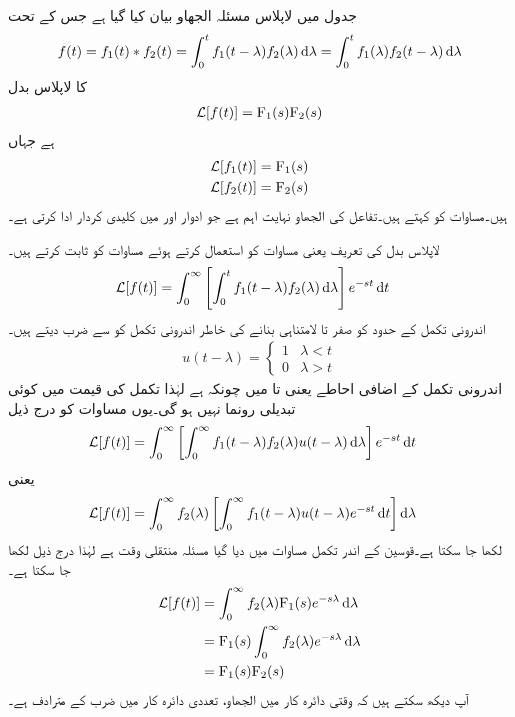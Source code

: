 جدول  میں لاپلاس مسئلہ الجھاو بیان کیا گیا ہے جس کے تحت 
\begin{align}\label{مساوات_لاپلاس_الجھاو_تعریف}
f(t)=f_1(t) \ast f_2(t)=\int_0^t f_1(t-\lambda)f_2(\lambda)\dif \lambda=\int_0^t f_1(\lambda)f_2(t-\lambda)\dif \lambda
\end{align}
کا لاپلاس بدل
\begin{align}\label{مساوات_لاپلاس_مسئلہ_الجھاو_تعریف}
\mathcal{L}[f(t)]={{\textup{F}}}_1(s){{\textup{F}}}_2(s)
\end{align}
ہے جہاں
\begin{align*}
\mathcal{L}[f_1(t)]&={{\textup{F}}}_1(s)\\
\mathcal{L}[f_2(t)]&={{\textup{F}}}_2(s)
\end{align*}
 ہیں۔مساوات  کو  کہتے ہیں۔تفاعل کی الجھاو نہایت اہم ہے جو ادوار اور   میں کلیدی کردار ادا کرتی ہے۔

لاپلاس بدل کی تعریف یعنی مساوات  کو استعمال کرتے ہوئے مساوات  کو ثابت کرتے ہیں۔
\begin{align}\label{مساوات_لاپلاس_الجھاو_الف}
\Laplace[f(t)]&=\int_0^{\infty}\left[\int_0^t f_1(t-\lambda)f_2(\lambda) \dif \lambda\right]e^{-st}\dif t
\end{align}
اندرونی تکمل کے حدود کو صفر تا لامتناہی بنانے کی خاطر اندرونی تکمل کو  سے ضرب دیتے ہیں۔
\begin{align*}
u(t-\lambda)=
\begin{cases}
1& \lambda<t\\
0&\lambda>t
\end{cases}
\end{align*}
اندرونی تکمل کے اضافی احاطے یعنی  تا  میں چونکہ  ہے لہٰذا تکمل کی قیمت میں کوئی تبدیلی رونما نہیں ہو گی۔یوں مساوات  کو درج ذیل
\begin{align*}
\Laplace[f(t)]&=\int_0^{\infty}\left[\int_0^{\infty} f_1(t-\lambda)f_2(\lambda) u(t-\lambda) \dif \lambda\right]e^{-st}\dif t
\end{align*}
یعنی
\begin{align*}
\Laplace[f(t)]&=\int_0^{\infty}f_2(\lambda)\left[\int_0^{\infty} f_1(t-\lambda) u(t-\lambda) e^{-st}\dif t\right]\dif \lambda
\end{align*}
لکھا جا سکتا ہے۔قوسین کے اندر تکمل مساوات  میں دیا گیا مسئلہ منتقلی وقت ہے لہٰذا درج ذیل لکھا جا سکتا ہے۔
 \begin{align*}
\Laplace[f(t)]&=\int_0^{\infty}f_2(\lambda)\bF_1(s)e^{-s \lambda}\dif \lambda\\
&=\bF_1(s)\int_0^{\infty} f_2(\lambda) e^{-s\lambda} \dif \lambda\\
&=\bF_1(s) \bF_2(s)
\end{align*}
آپ دیکھ سکتے ہیں کہ وقتی دائرہ کار میں الجھاو، تعددی دائرہ کار میں ضرب کے مترادف ہے۔

